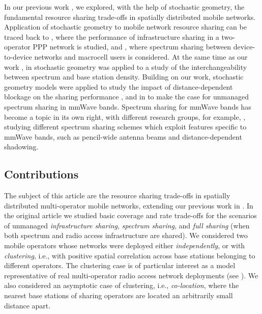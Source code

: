 \documentclass[12pt, journal,doublecolumn, final]{IEEEtran}
\begin{document}
In our previous work \cite{KibildaDiFrancescoMalandrinoDaSilva_2015}, we explored, with the help of stochastic geometry, the fundamental resource sharing trade-offs in spatially distributed mobile networks. Application of stochastic geometry to mobile network resource sharing can be traced back to \cite{HuaLiuPanwar_2012}, where the performance of infrastructure sharing in a two-operator \ac{PPP} network is studied, and \cite{LinAndrewsGhosh_2014}, where spectrum sharing between device-to-device networks and macrocell users is considered. At the same time as our work \cite{KibildaDiFrancescoMalandrinoDaSilva_2015}, in \cite{YangSung_2015} stochastic geometry was applied to a study of the interchangeability between spectrum and base station density. Building on our work, stochastic geometry models were applied to study the impact of distance-dependent blockage on the sharing performance \cite{WangSamdanisPerezDiRenzo_2016}, and in \cite{GuptaAndrewsHeath_2015,RebatoMezzavillaRanganZorzi_2016} to make the case for unmanaged spectrum sharing in \ac{mmWave} bands. Spectrum sharing for \ac{mmWave} bands has become a topic in its own right, with different research groups, for example, \cite{GuptaAndrewsHeath_2015,GuptaAlkhateebAndrewsHeath_2016,BoccardiShokri-GhadikolaeiFodorEtAl_2016}, studying different spectrum sharing schemes which exploit features specific to \ac{mmWave} bands, such as pencil-wide antenna beams and distance-dependent shadowing.

\subsection{Contributions}

The subject of this article are the resource sharing trade-offs in spatially distributed multi-operator mobile networks, extending our previous work in \cite{KibildaDiFrancescoMalandrinoDaSilva_2015}. In the original article we studied basic coverage and rate trade-offs for the scenarios of unmanaged \textit{infrastructure sharing}, \textit{spectrum sharing}, and \textit{full sharing} (when both spectrum and radio access infrastructure are shared). We considered two mobile operators whose networks were deployed either \emph{independently}, or with \emph{clustering}, i.e., with positive spatial correlation across base stations belonging to different operators. The clustering case is of particular interest as a model representative of real multi-operator radio access network deployments (see \cite{KibildaGalkinDaSilva_2015}). We also considered an asymptotic case of clustering, i.e., \emph{co-location}, where the nearest base stations of sharing operators are located an arbitrarily small distance apart.
\end{document}
